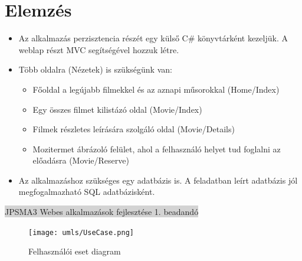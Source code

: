 \documentclass[11pt,a4paper]{article}
\begin{document}
\section{Elemzés}
\begin{itemize}
	\item Az alkalmazás perzisztencia részét egy külső C\# könyvtárként
	kezeljük. A weblap részt MVC segítségével hozzuk létre.
	\item Több oldalra (Nézetek) is szükségünk van:
	\begin{itemize}
		\item Főoldal a legújabb filmekkel és az aznapi műsorokkal (Home/Index)
		\item Egy összes filmet kilistázó oldal (Movie/Index)
		\item Filmek részletes leírására szolgáló oldal (Movie/Details)
		\item Mozitermet ábrázoló felület, ahol a felhasználó helyet tud
		foglalni az előadásra (Movie/Reserve)
	\end{itemize}
	\item Az alkalmazáshoz szükséges egy adatbázis is. A feladatban leírt
	adatbázis jól megfogalmazható SQL adatbázisként.
\end{itemize}
\newpage
\thispagestyle{empty}
\begin{center}
	\colorbox{lightgray}{{\large JPSMA3} \hspace{3cm} {\large Webes alkalmazások fejlesztése 1. beadandó} \hspace{5cm} \thepage}
\end{center}
\begin{figure}[h]
	\centering
	\texttt{[image: umls/UseCase.png]}
	\caption{Felhasználói eset diagram}
\end{figure}
\end{document}
